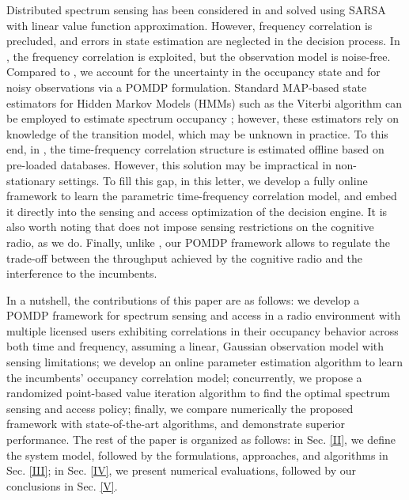 \documentclass[10pt,twocolumn]{IEEEtran}
\begin{document}
Distributed spectrum sensing has been considered in \cite{6507570} and solved using SARSA with linear value function approximation. However, frequency correlation is precluded, and errors in state estimation are neglected in the decision process. In \cite{6956794}, the frequency correlation is exploited, but the observation model is noise-free. Compared to \cite{6507570, 6956794}, we account for the uncertainty in the occupancy state and for noisy observations via a POMDP formulation. Standard MAP-based state estimators for Hidden Markov Models (HMMs) such as the Viterbi algorithm can be employed to estimate spectrum occupancy \cite{4554696}; however, these estimators rely on knowledge of the transition model, which may be unknown in practice. To this end, in \cite{6956794, 4554696}, the time-frequency correlation structure is estimated offline based on pre-loaded databases. However, this solution may be impractical in non-stationary settings. To fill this gap, in this letter, we develop a fully online framework  to learn the parametric time-frequency correlation model, and embed it directly into the sensing and access optimization of the decision engine. It is also worth noting that \cite{4554696} does not impose sensing restrictions on the cognitive radio, as we do. Finally, unlike \cite{7094730, 6507570, 4554696, 6956794}, our POMDP framework allows to regulate the trade-off between the throughput achieved by the cognitive radio and the interference to the incumbents.

In a nutshell, the contributions of this paper are as follows:
we develop a POMDP framework for spectrum sensing and access in a radio environment with multiple licensed users exhibiting correlations in their occupancy behavior across both time and frequency, assuming a linear, Gaussian observation model with sensing limitations; we develop an online parameter estimation algorithm to learn the incumbents' occupancy correlation model; 
concurrently, we propose a randomized point-based value iteration algorithm to find the optimal spectrum sensing and access policy; finally, we compare numerically the proposed framework with state-of-the-art algorithms, and demonstrate superior performance. The rest of the paper is organized as follows: in Sec. \ref{II}, we define the system model, followed by the formulations, approaches, and algorithms in Sec. \ref{III}; in Sec. \ref{IV}, we present numerical evaluations, followed by our conclusions in Sec. \ref{V}.
\vspace{-4mm}
\end{document}
